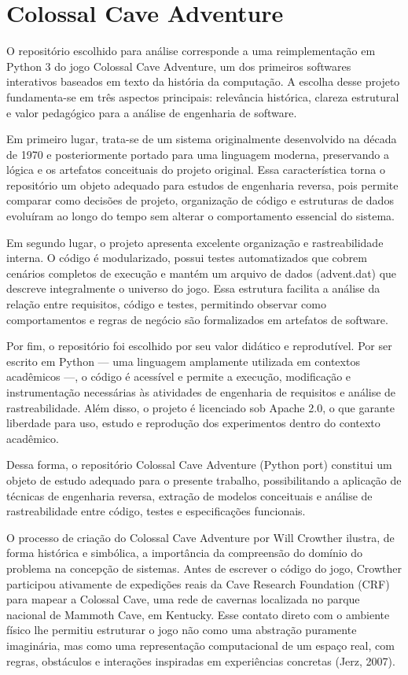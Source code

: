 \documentclass[12pt,a4paper]{article}
\begin{document}
\section{Colossal Cave Adventure}
O repositório escolhido para análise corresponde a uma reimplementação em Python 3 do jogo Colossal Cave Adventure, um dos primeiros softwares interativos baseados em texto da história da computação. A escolha desse projeto fundamenta-se em três aspectos principais: relevância histórica, clareza estrutural e valor pedagógico para a análise de engenharia de software.

Em primeiro lugar, trata-se de um sistema originalmente desenvolvido na década de 1970 e posteriormente portado para uma linguagem moderna, preservando a lógica e os artefatos conceituais do projeto original. Essa característica torna o repositório um objeto adequado para estudos de engenharia reversa, pois permite comparar como decisões de projeto, organização de código e estruturas de dados evoluíram ao longo do tempo sem alterar o comportamento essencial do sistema.

Em segundo lugar, o projeto apresenta excelente organização e rastreabilidade interna. O código é modularizado, possui testes automatizados que cobrem cenários completos de execução e mantém um arquivo de dados (advent.dat) que descreve integralmente o universo do jogo. Essa estrutura facilita a análise da relação entre requisitos, código e testes, permitindo observar como comportamentos e regras de negócio são formalizados em artefatos de software.

Por fim, o repositório foi escolhido por seu valor didático e reprodutível. Por ser escrito em Python — uma linguagem amplamente utilizada em contextos acadêmicos —, o código é acessível e permite a execução, modificação e instrumentação necessárias às atividades de engenharia de requisitos e análise de rastreabilidade. Além disso, o projeto é licenciado sob Apache 2.0, o que garante liberdade para uso, estudo e reprodução dos experimentos dentro do contexto acadêmico.

Dessa forma, o repositório Colossal Cave Adventure (Python port) constitui um objeto de estudo adequado para o presente trabalho, possibilitando a aplicação de técnicas de engenharia reversa, extração de modelos conceituais e análise de rastreabilidade entre código, testes e especificações funcionais.

O processo de criação do Colossal Cave Adventure por Will Crowther ilustra, de forma histórica e simbólica, a importância da compreensão do domínio do problema na concepção de sistemas. Antes de escrever o código do jogo, Crowther participou ativamente de expedições reais da Cave Research Foundation (CRF) para mapear a Colossal Cave, uma rede de cavernas localizada no parque nacional de Mammoth Cave, em Kentucky. Esse contato direto com o ambiente físico lhe permitiu estruturar o jogo não como uma abstração puramente imaginária, mas como uma representação computacional de um espaço real, com regras, obstáculos e interações inspiradas em experiências concretas (Jerz, 2007).
\end{document}

